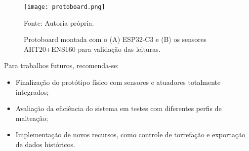 \begin{figure}[ht]
    \centering
    \caption{Protoboard montada com o (A) ESP32-C3 e (B) os sensores AHT20+ENS160 para validação das leituras.}
    \label{fig:protoboard}
    \texttt{[image: protoboard.png]}

    {\centering\footnotesize Fonte: Autoria própria.\par}
  \end{figure}
  
Para trabalhos futuros, recomenda-se:
  
  \begin{itemize}
      \item Finalização do protótipo físico com sensores e atuadores totalmente integrados;
      \item Avaliação da eficiência do sistema em testes com diferentes perfis de malteação;
      \item Implementação de novos recursos, como controle de torrefação e exportação de dados históricos.
  \end{itemize}